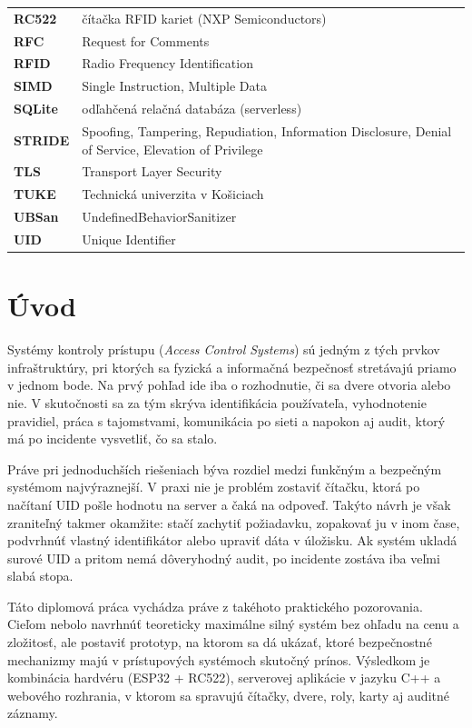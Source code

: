 \documentclass[journal,a4paper,onecolumn]{IEEEtran}
\begin{document}
\begin{tabular}{>{\bfseries}p{2.8cm} p{12.2cm}}
RC522  & čítačka RFID kariet (NXP Semiconductors) \\[2pt]
RFC    & Request for Comments \\[2pt]
RFID   & Radio Frequency Identification \\[2pt]
SIMD   & Single Instruction, Multiple Data \\[2pt]
SQLite & odľahčená relačná databáza (serverless) \\[2pt]
STRIDE & Spoofing, Tampering, Repudiation, Information Disclosure, Denial of Service, Elevation of Privilege \\[2pt]
TLS    & Transport Layer Security \\[2pt]
TUKE   & Technická univerzita v Košiciach \\[2pt]
UBSan  & UndefinedBehaviorSanitizer \\[2pt]
UID    & Unique Identifier \\[2pt]
\end{tabular}

\clearpage

\section{Úvod}

Systémy kontroly prístupu (\emph{Access Control Systems}) sú jedným z tých prvkov infraštruktúry, pri ktorých sa fyzická a informačná bezpečnosť stretávajú priamo v jednom bode. Na prvý pohľad ide iba o rozhodnutie, či sa dvere otvoria alebo nie. V skutočnosti sa za tým skrýva identifikácia používateľa, vyhodnotenie pravidiel, práca s tajomstvami, komunikácia po sieti a napokon aj audit, ktorý má po incidente vysvetliť, čo sa stalo.

Práve pri jednoduchších riešeniach býva rozdiel medzi funkčným a bezpečným systémom najvýraznejší. V praxi nie je problém zostaviť čítačku, ktorá po načítaní UID pošle hodnotu na server a čaká na odpoveď. Takýto návrh je však zraniteľný takmer okamžite: stačí zachytiť požiadavku, zopakovať ju v inom čase, podvrhnúť vlastný identifikátor alebo upraviť dáta v úložisku. Ak systém ukladá surové UID a pritom nemá dôveryhodný audit, po incidente zostáva iba veľmi slabá stopa.

Táto diplomová práca vychádza práve z takéhoto praktického pozorovania. Cieľom nebolo navrhnúť teoreticky maximálne silný systém bez ohľadu na cenu a zložitosť, ale postaviť prototyp, na ktorom sa dá ukázať, ktoré bezpečnostné mechanizmy majú v prístupových systémoch skutočný prínos. Výsledkom je kombinácia hardvéru (ESP32 + RC522), serverovej aplikácie v jazyku C++ a webového rozhrania, v ktorom sa spravujú čítačky, dvere, roly, karty aj auditné záznamy.
\end{document}

